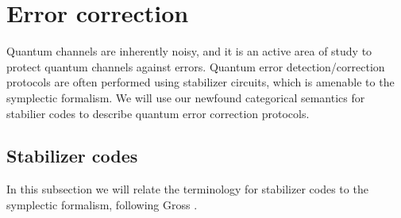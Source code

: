 \section{Error correction}
\label{sec:qec}


Quantum channels are inherently noisy, and it is an active area of study to protect quantum channels against errors.  Quantum error detection/correction protocols are often performed using stabilizer circuits, which is amenable to the symplectic formalism.  We will use our newfound categorical semantics for stabilier codes to describe quantum error correction protocols. 

\subsection{Stabilizer codes}



In this subsection we will relate the terminology for stabilizer codes to the symplectic formalism, following Gross \cite{gross}.





